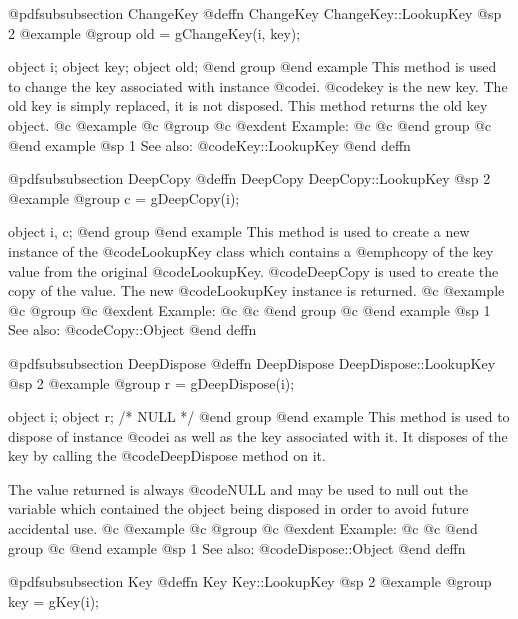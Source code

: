 @pdfsubsubsection {ChangeKey}
@deffn {ChangeKey} ChangeKey::LookupKey
@sp 2
@example
@group
old = gChangeKey(i, key);

object  i;
object  key;
object  old;
@end group
@end example
This method is used to change the key associated with instance @code{i}.
@code{key} is the new key.  The old key is simply replaced, it is not
disposed.  This method returns the old key object.
@c @example
@c @group
@c @exdent Example:
@c 
@c @end group
@c @end example
@sp 1
See also:  @code{Key::LookupKey}
@end deffn













@pdfsubsubsection {DeepCopy}
@deffn {DeepCopy} DeepCopy::LookupKey
@sp 2
@example
@group
c = gDeepCopy(i);

object  i, c;
@end group
@end example
This method is used to create a new instance of the
@code{LookupKey} class which contains a @emph{copy} of the
key value from the original @code{LookupKey}.  @code{DeepCopy} is
used to create the copy of the value.  The new
@code{LookupKey} instance is returned.
@c @example
@c @group
@c @exdent Example:
@c 
@c @end group
@c @end example
@sp 1
See also:  @code{Copy::Object}
@end deffn













@pdfsubsubsection {DeepDispose}
@deffn {DeepDispose} DeepDispose::LookupKey
@sp 2
@example
@group
r = gDeepDispose(i);

object  i;
object  r;     /*  NULL  */
@end group
@end example
This method is used to dispose of instance @code{i} as well as the key
associated with it.  It disposes of the key by calling the
@code{DeepDispose} method on it.

The value returned is always @code{NULL} and may be used to null out
the variable which contained the object being disposed in order to
avoid future accidental use.
@c @example
@c @group
@c @exdent Example:
@c 
@c @end group
@c @end example
@sp 1
See also:  @code{Dispose::Object}
@end deffn








@pdfsubsubsection {Key}
@deffn {Key} Key::LookupKey
@sp 2
@example
@group
key = gKey(i);


